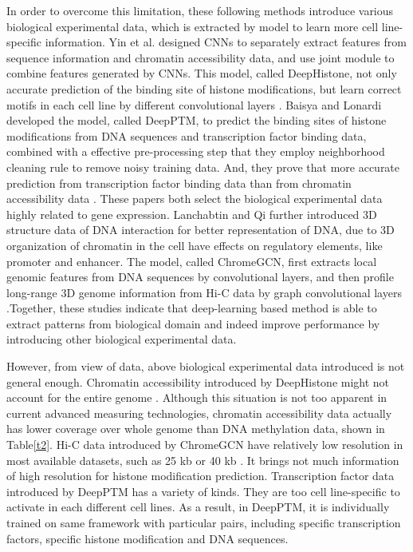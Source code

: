 In order to overcome this limitation, these following methods introduce various biological experimental data, which is extracted by model to learn more cell line-specific information. Yin et al. designed CNNs to separately extract features from sequence information and chromatin accessibility data, and use joint module to combine features generated by CNNs. This model, called DeepHistone, not only accurate prediction of the binding site of histone modifications, but learn correct motifs in each cell line by different convolutional layers \cite{yin2019deephistone}. Baisya and Lonardi developed the model, called DeepPTM, to predict the binding sites of histone modifications from DNA sequences and transcription factor binding data, combined with a effective pre-processing step that they employ neighborhood cleaning rule to remove noisy training data. And, they prove that more accurate prediction from transcription factor binding data than from chromatin accessibility data \cite{baisya2020prediction}. These papers both select the biological experimental data highly related to gene expression. Lanchabtin and Qi further introduced 3D structure data of DNA interaction for better representation of DNA, due to 3D organization of chromatin in the cell have effects on regulatory elements, like promoter and enhancer. The model, called ChromeGCN, first extracts local genomic features from DNA sequences by convolutional layers, and then profile long-range 3D genome information from Hi-C data by graph convolutional layers \cite{lanchantin2020graph}.Together, these studies indicate that deep-learning based method is able to extract patterns from biological domain and indeed improve performance by introducing other biological experimental data.

However, from view of data, above biological experimental data introduced is not general enough. Chromatin accessibility introduced by DeepHistone might not account for the entire genome \cite{yan2016genome}. Although this situation is not too apparent in current advanced measuring technologies, chromatin accessibility data actually has lower coverage over whole genome than DNA methylation data, shown in Table\ref{t2}. Hi-C data introduced by ChromeGCN have relatively low resolution in most available datasets, such as 25 kb or 40 kb \cite{zhang2018enhancing}. It brings not much information of high resolution for histone modification prediction. Transcription factor data introduced by DeepPTM has a variety of kinds. They are too cell line-specific to activate in each different cell lines. As a result, in DeepPTM, it is individually trained on same framework with particular pairs, including specific transcription factors, specific histone modification and DNA sequences.

